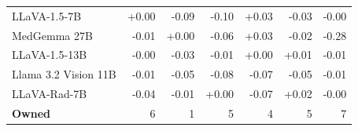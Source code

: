 \documentclass[11pt]{article}
\begin{document}
\begin{table}[t]
{\begin{tabular}{lrrrrrr}
LLaVA-1.5-7B & \cellcolor{cfTerra1}+0.00 & \cellcolor{cfSlate2}-0.09 & \cellcolor{cfSlate2}-0.10 & \cellcolor{cfTerra2}+0.03 & \cellcolor{cfSlate2}-0.03 & \cellcolor{cfSlate1}-0.00 \\
MedGemma 27B & \cellcolor{cfSlate1}-0.01 & \cellcolor{cfTerra1}+0.00 & \cellcolor{cfSlate2}-0.06 & \cellcolor{cfTerra2}+0.03 & \cellcolor{cfSlate1}-0.02 & \cellcolor{cfSlate4}-0.28 \\
LLaVA-1.5-13B & \cellcolor{cfSlate1}-0.00 & \cellcolor{cfSlate2}-0.03 & \cellcolor{cfSlate1}-0.01 & \cellcolor{cfTerra1}+0.00 & \cellcolor{cfTerra1}+0.01 & \cellcolor{cfSlate1}-0.01 \\
Llama 3.2 Vision 11B & \cellcolor{cfSlate1}-0.01 & \cellcolor{cfSlate2}-0.05 & \cellcolor{cfSlate2}-0.08 & \cellcolor{cfSlate2}-0.07 & \cellcolor{cfSlate2}-0.05 & \cellcolor{cfSlate1}-0.01 \\
LLaVA-Rad-7B & \cellcolor{cfSlate2}-0.04 & \cellcolor{cfSlate1}-0.01 & \cellcolor{cfTerra1}+0.00 & \cellcolor{cfSlate2}-0.07 & \cellcolor{cfTerra2}+0.02 & \cellcolor{cfSlate1}-0.00 \\
\midrule
\textbf{Owned} & 6 & 1 & 5 & 4 & 5 & 7 \\
\bottomrule
\end{tabular}}
\end{table}
\end{document}
